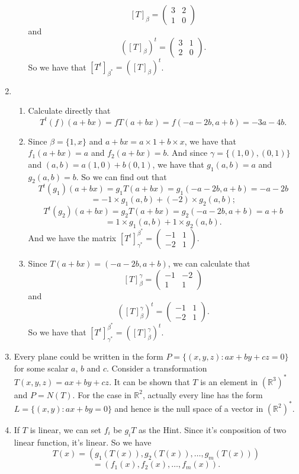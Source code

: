 \begin{enumerate}
\begin{enumerate}
\[[T]_{\beta}=\left(\begin{array}{cc}3&2\\1&0\end{array}\right)\]
and 
\[([T]_{\beta})^t=\left(\begin{array}{cc}3&1\\2&0\end{array}\right).\]
So we have that $[T^t]_{\beta^*}=([T]_{\beta})^t$.
\end{enumerate}
\item \begin{enumerate}
\item Calculate directly that 
\[T^t(f)(a+bx)=fT(a+bx)=f(-a-2b,a+b)=-3a-4b.\]
\item Since $\beta=\{1,x\}$ and $a+bx=a\times 1+b\times x$, we have that $f_1(a+bx)=a$ and $f_2(a+bx)=b$. And since $\gamma=\{(1,0),(0,1)\}$ and $(a,b)=a(1,0)+b(0,1)$, we have that $g_1(a,b)=a$ and $g_2(a,b)=b$. So we can find out that 
\[T^t(g_1)(a+bx)=g_1T(a+bx)=g_1(-a-2b,a+b)=-a-2b\]
\[=-1\times g_1(a,b)+(-2)\times g_2(a,b);\]
\[T^t(g_2)(a+bx)=g_2T(a+bx)=g_2(-a-2b,a+b)=a+b\]
\[=1\times g_1(a,b)+1\times g_2(a,b).\]
And we have the matrix $[T^t]_{\gamma^*}^{\beta^*}=\left(\begin{array}{cc}-1&1\\-2&1\end{array}\right).$
\item Since $T(a+bx)=(-a-2b,a+b)$, we can calculate that 
\[[T]_{\beta}^{\gamma}=\left(\begin{array}{cc}-1&-2\\1&1\end{array}\right)\]
and 
\[([T]_{\beta}^{\gamma})^t=\left(\begin{array}{cc}-1&1\\-2&1\end{array}\right).\]
So we have that $[T^t]_{\gamma^*}^{\beta^*}=([T]_{\beta}^{\gamma})^t$.
\end{enumerate}
\item Every plane could be written in the form $P=\{(x,y,z):ax+by+cz=0\}$ for some scalar $a$, $b$ and $c$. Consider a transformation $T(x,y,z)=ax+by+cz$. It can be shown that $T$ is an element in $(\mathbb{R}^3)^*$ and $P=N(T)$. For the case in $\mathbb{R}^2$, actually every line has the form $L=\{(x,y):ax+by=0\}$ and hence is the null space of a vector in $(\mathbb{R}^2)^*$.
\item If $T$ is linear, we can set $f_i$ be $g_iT$ as the Hint. Since it's conposition of two linear function, it's linear. So we have 
\[T(x)=(g_1(T(x)),g_2(T(x)),\ldots ,g_m(T(x)))\]
\[=(f_1(x),f_2(x),\ldots ,f_m(x)).\]


\end{enumerate}
